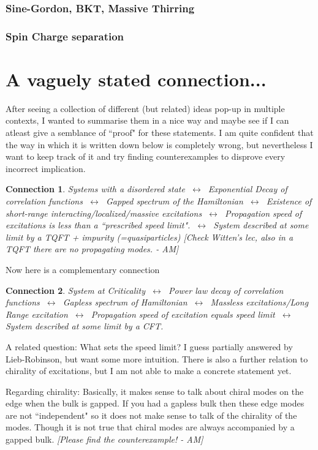 \documentclass{article}
\newcommand\AM[1]{{\it \color{darkblue}  [#1 - AM]}}
\newtheorem{conn}{Connection}
\begin{document}
\subsubsection{Sine-Gordon, BKT, Massive Thirring}
\subsubsection{Spin Charge separation}
\section{A vaguely stated connection...}
After seeing a collection of different (but related) ideas pop-up in multiple contexts, I wanted to summarise them in a nice way and maybe see if I can atleast give a semblance of ``proof" for these statements. I am quite confident that the way in which it is written down below is completely wrong, but nevertheless I want to keep track of it and try finding counterexamples to disprove every incorrect implication.

\begin{conn}
    Systems with a disordered state $~\longleftrightarrow~$ Exponential Decay of correlation functions 
    $~\longleftrightarrow~$ Gapped spectrum of the Hamiltonian
    $~\longleftrightarrow~$ Existence of short-range interacting/localized/massive excitations
    $~\longleftrightarrow~$ Propagation speed of excitations is less than a ``prescribed speed limit".
    $~\longleftrightarrow~$ System described at some limit by a TQFT + impurity (=quasiparticles) \AM{Check Witten's lec, also in a TQFT there are no propagating modes.}
\end{conn}

Now here is a complementary connection
\begin{conn}
    System at Criticality 
    $~\longleftrightarrow~$ Power law decay of correlation functions
    $~\longleftrightarrow~$ Gapless spectrum of Hamiltonian
    $~\longleftrightarrow~$ Massless excitations/Long Range excitation
    $~\longleftrightarrow~$ Propagation speed of excitation equals speed limit
    $~\longleftrightarrow~$ System described at some limit by a CFT.
\end{conn}
A related question: What sets the speed limit? I guess partially answered by Lieb-Robinson, but want some more intuition. There is also a further relation to chirality of excitations, but I am not able to make a concrete statement yet.

Regarding chirality: Basically, it makes sense to talk about chiral modes on the edge when the bulk is gapped. If you had a gapless bulk then these edge modes are not ``independent" so it does not make sense to talk of the chirality of the modes. Though it is not true that chiral modes are always accompanied by a gapped bulk.\AM{Please find the counterexample!}
\end{document}
